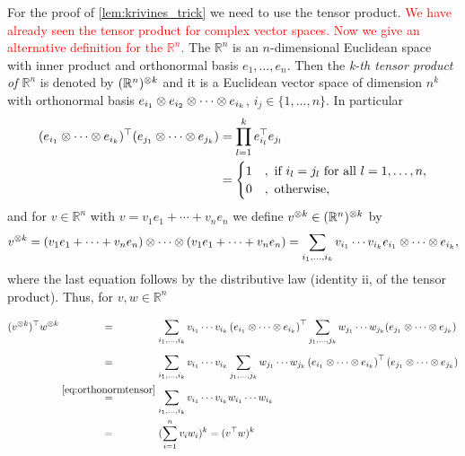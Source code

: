 For the proof of \ref{lem:krivines_trick} we need to use the tensor product. \textcolor{red}{We have already seen the tensor product for complex vector spaces. Now we give an alternative definition for the $\mathbb{R}^n$.} The $\mathbb{R}^n$ is an $n$-dimensional Euclidean space with inner product \sclr{\cdot}{\cdot} and orthonormal basis $e_1,\dots,e_n$.
Then the \emph{k-th tensor product of $\mathbb{R}^n$} is denoted by $(\mathbb{R}^n)^{\otimes k}$ and it is a Euclidean  vector space of dimension $n^k$ with orthonormal basis $e_{i_1}\otimes e_{i_2} \otimes \cdots \otimes e_{i_k}$, $i_j\in\{1,\dots,n\}$. In particular
\begin{align}
	(e_{i_1}\otimes \cdots \otimes e_{i_k})^\top (e_{j_1}\otimes \cdots \otimes e_{j_k}) 
	&= \prod_{l=1}^k e_{i_l}^\top e_{j_l}\nonumber\\
	&=\begin{cases}
		1 & , \text{ if } i_l=j_l \text{ for all } l=1,\dots,n,\\
		0 & , \text{ otherwise},
	\end{cases} \label{eq:orthonormtensor}
\end{align}
and for $v\in\mathbb{R}^n$ with $v=v_1e_1+\cdots +v_ne_n$ we define $v^{\otimes k} \in (\mathbb{R}^n)^{\otimes k}$ by 
\begin{equation}
	v^{\otimes k} = (v_1e_1 + \cdots + v_ne_n) \otimes \cdots \otimes (v_1e_1 + \cdots + v_ne_n) = \sum_{i_1,\dots,i_k} v_{i_1}\cdots v_{i_k} e_{i_1}\otimes\cdots\otimes e_{i_k},
\end{equation}
where the last equation follows by the distributive law (identity ii, of the tensor product). 
Thus, for $v,w\in\mathbb{R}^n$ 
\begin{align}
	(v^{\tensor k})^\top w^{\tensor k}
	&\overset{\textcolor{white}{\eqref*{eq:orthonormtensor}}}{=} \sum_{i_1,\dots,i_k} v_{i_1}\cdots v_{i_k}\left(e_{i_1}\tensor\cdots\tensor e_{i_k}\right)^\top \sum_{j_1,\dots,j_k} w_{j_1}\cdots w_{j_k}(e_{j_1}\tensor\cdots\tensor e_{j_k}) \nonumber\\
	&\overset{\textcolor{white}{\eqref*{eq:orthonormtensor}}}{=} \sum_{i_1,\dots,i_k} v_{i_1}\cdots v_{i_k} \sum_{j_1,\dots,j_k} w_{j_1}\cdots w_{j_k} \left(e_{i_1}\tensor\cdots\tensor e_{i_k}\right)^\top (e_{j_1}\tensor\cdots\tensor e_{j_k}) \nonumber\\
	&\overset{\eqref{eq:orthonormtensor}}{=} \sum_{i_1,\dots,i_k} v_{i_1}\cdots v_{i_k}w_{i_1}\cdots w_{i_k} \nonumber\\
	&\overset{\textcolor{white}{\eqref*{eq:orthonormtensor}}}{=}(\sum_{i=1}^n v_iw_i)^k = (v^\top w)^k \label{eq:kth_tensor}
\end{align}
